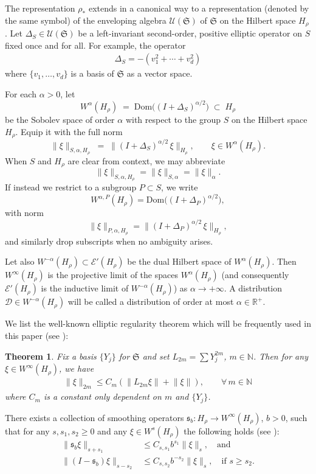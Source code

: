 \documentclass[11 pt]{amsart}
\newcommand{\NN}{\mathbb{N}}
\newcommand{\norm}[1]{\lVert#1\rVert}
\newtheorem{theorem}{Theorem}[section]
\theoremstyle{definition}
\numberwithin{equation}{section}
\begin{document}
The representation $\rho_*$ extends in a canonical way to a representation (denoted by the same symbol) of the enveloping algebra $\mathcal{U}(\mathfrak{S})$ of $\mathfrak{S}$ on the Hilbert space $H_\rho$. Let $\Delta_S \in \mathcal{U}(\mathfrak{S})$ be a left-invariant second-order, positive elliptic operator on $S$ fixed once and for all. For example, the operator
\begin{align*}
 \Delta_S = -\left( v_1^2 + \cdots + v_d^2 \right)
\end{align*}
where $\{ v_1, \ldots, v_d \}$ is a basis of $\mathfrak{S}$ as a vector space.

For each \(\alpha>0\), let
\[
W^{\alpha}(H_\rho)
\;=\;
\mathrm{Dom}\bigl((I + \Delta_{S})^{\alpha/2}\bigr)
\;\subset\;
H_{\rho}
\]
be the Sobolev space of order \(\alpha\) with respect to the group \(S\) on the Hilbert space \(H_{\rho}\).  Equip it with the full norm
\[
\|\xi\|_{S,\alpha,H_{\rho}}
\;=\;
\bigl\|(I + \Delta_{S})^{\alpha/2}\,\xi\bigr\|_{H_{\rho}},
\qquad
\xi\in W^{\alpha}(H_\rho).
\]
When \(S\) and \(H_{\rho}\) are clear from context, we may abbreviate
\[
\|\xi\|_{S,\alpha,H_{\rho}}
=\|\xi\|_{S,\alpha}
=\|\xi\|_{\alpha}.
\]
If instead we restrict to a subgroup \(P\subset S\), we write
\[
W^{\alpha,P}(H_{\rho})
=\mathrm{Dom}\bigl((I + \Delta_{P})^{\alpha/2}\bigr),
\]
with norm
\[
\|\xi\|_{P,\alpha,H_{\rho}}
=\bigl\|(I + \Delta_{P})^{\alpha/2}\,\xi\bigr\|_{H_{\rho}},
\]
and similarly drop subscripts when no ambiguity arises.




Let also $W^{-\alpha}(H_\rho) \subset \mathcal{E}'(H_\rho)$ be the dual Hilbert space of $W^\alpha(H_\rho)$. Then $W^\infty(H_\rho)$ is the projective limit of the spaces $W^\alpha(H_\rho)$ (and consequently $\mathcal{E}'(H_\rho)$ is the inductive limit of $W^{-\alpha}(H_\rho)$) as $\alpha \to +\infty$. A distribution $\mathcal{D} \in W^{-\alpha}(H_\rho)$ will be called a distribution of order at most $\alpha \in \mathbb{R}^+$.

We list the well-known elliptic regularity theorem which will be frequently
used in this paper (see \cite[Chapter I, Corollary 6.5 and 6.6]{Robinson}):
\begin{theorem}\label{th:15}
Fix a basis $\{Y_j\}$ for $\mathfrak{S}$ and set $L_{2m}=\sum Y_j^{2m}$, $m\in\NN$. Then for any $\xi\in W^\infty(H_\rho)$, we have
\begin{align*}
    \norm{\xi}_{2m}\leq C_m(\norm{L_{2m}\xi}+\norm{\xi}),\qquad \forall\, m\in\NN
\end{align*}
where $C_m$ is a constant only dependent on $m$ and $\{Y_j\}$.
\end{theorem}
There exists a collection of smoothing operators $\mathfrak{s}_b: H_\rho\to W^\infty(H_\rho)$, $b>0$, such that for any $s, s_1,s_2\geq0$ and any $\xi\in W^s(H_\rho)$ the following holds (see \cite{Hamilton}):
\begin{align}
 \norm{\mathfrak{s}_b\xi}_{s+s_1}&\leq C_{s,s_1}b^{s_1}\norm{\xi}_{s},\quad \text{and}\label{for:197}\\
 \norm{(I-\mathfrak{s}_b)\xi}_{s-s_2}&\leq C_{s,s_2}b^{-s_2}\norm{\xi}_{s},\quad \text{if }s\geq s_2.\label{for:198}
\end{align}
\end{document}
